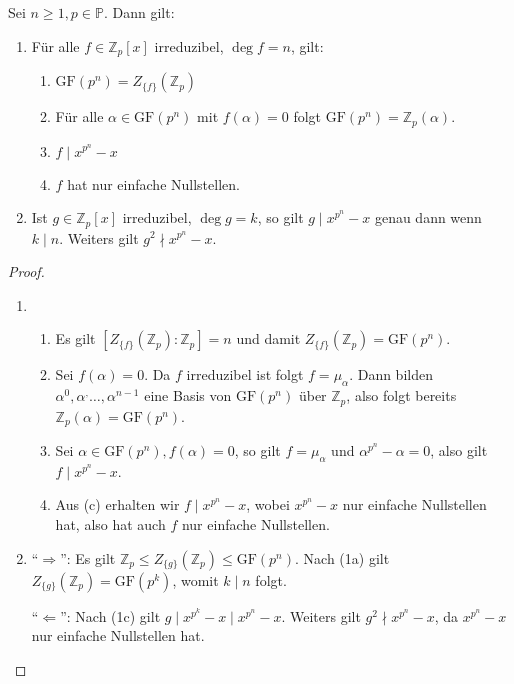 \begin{lemma}
    Sei $n \geq 1, p \in \mathbb{P}$. Dann gilt:
    \begin{enumerate}
        \item Für alle $f \in \mathbb{Z}_p[x]$ irreduzibel, $\deg f = n$, gilt:
        \begin{enumerate}
            \item $\mathrm{GF}(p^n) = Z_{\{f\}}(\mathbb{Z}_p)$
            \item Für alle $\alpha \in \mathrm{GF}(p^n)$ mit $f(\alpha) = 0$ folgt $\mathrm{GF}(p^n) = \mathbb{Z}_p(\alpha)$.
            \item $f \mid x^{p^n} - x$
            \item $f$ hat nur einfache Nullstellen.
        \end{enumerate}
        \item Ist $g \in \mathbb{Z}_p[x]$ irreduzibel, $\deg g = k$, so gilt $g \mid x^{p^n} - x$ genau dann wenn $k \mid n$. Weiters gilt $g^2 \nmid x^{p^n} - x$.
    \end{enumerate}
\end{lemma}

\begin{proof}{\ }
    \begin{enumerate}
        \item \begin{enumerate}
            \item Es gilt $[Z_{\{f\}}(\mathbb{Z}_p) : \mathbb{Z}_p] = n$ und damit $Z_{\{f\}}(\mathbb{Z}_p) = \mathrm{GF}(p^n)$.
            \item Sei $f(\alpha) = 0$. Da $f$ irreduzibel ist folgt $f = \mu_\alpha$. Dann bilden $\alpha^0, \alpha^, \hdots, \alpha^{n-1}$ eine Basis von $\mathrm{GF}(p^n)$ über $\mathbb{Z}_p$, also folgt bereits $\mathbb{Z}_p(\alpha) = \mathrm{GF}(p^n)$.
            \item Sei $\alpha \in \mathrm{GF}(p^n), f(\alpha) = 0$, so gilt $f = \mu_\alpha$ und $\alpha^{p^n} - \alpha = 0$, also gilt $f \mid x^{p^n} - x$.
            \item Aus (c) erhalten wir $f \mid x^{p^n} - x$, wobei $x^{p^n} - x$ nur einfache Nullstellen hat, also hat auch $f$ nur einfache Nullstellen.
        \end{enumerate}
        \item ``$\Rightarrow$'': Es gilt $\mathbb{Z}_p \leq Z_{\{g\}}(\mathbb{Z}_p) \leq \mathrm{GF}(p^n)$. Nach (1a) gilt $Z_{\{g\}}(\mathbb{Z}_p) = \mathrm{GF}(p^k)$, womit $k \mid n$ folgt.
        
        ``$\Leftarrow$'': Nach (1c) gilt $g \mid x^{p^k} - x \mid x^{p^n} - x$. Weiters gilt $g^2 \nmid x^{p^n} - x$, da $x^{p^n} - x$ nur einfache Nullstellen hat.
    \end{enumerate}
\end{proof}

